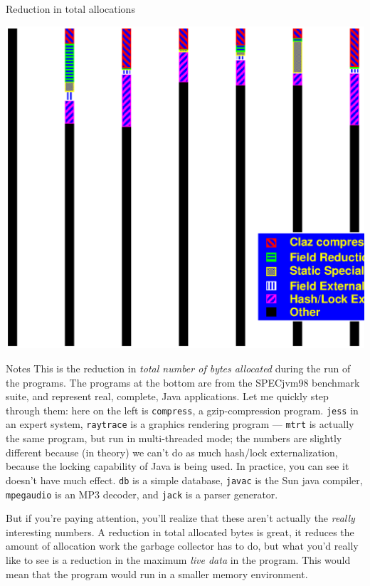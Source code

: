 \documentclass[%
pdf,
colorBG,
slideColor,
nototal,
oqe
]{prosper}
\newenvironment{talknotes}{\begin{slide}{Notes}\tiny}{\end{slide}}
\begin{document}
\begin{slide}{Reduction in total allocations}
\begin{center}
\includegraphics[scale=0.45]{Figures/oopsla-ttlalloc-color.eps}
\end{center}
\end{slide}

\begin{talknotes}
This is the reduction in \emph{total number of bytes allocated} during
the run of the programs.  The programs at the bottom are from the
SPECjvm98 benchmark suite, and represent real, complete, Java
applications.  Let me quickly step through them: here on the left is
{\tt compress}, a gzip-compression program.  {\tt jess} in an expert
system, {\tt raytrace} is a graphics rendering program --- {\tt mtrt}
is actually the same program, but run in multi-threaded mode; the
numbers are slightly different because (in theory) we can't do as much
hash/lock externalization, because the locking capability of Java is
being used.  In practice, you can see it doesn't have much effect.
{\tt db} is a simple database, {\tt javac} is the Sun java compiler,
{\tt mpegaudio} is an MP3 decoder, and {\tt jack} is a parser
generator.

But if you're paying attention, you'll realize that these aren't
actually the \emph{really} interesting numbers.  A reduction in total
allocated bytes is great, it reduces the amount of allocation work the
garbage collector has to do, but what you'd really like to see is a
reduction in the maximum \emph{live data} in the program.  This would
mean that the program would run in a smaller memory environment.

~%
\end{talknotes}
\end{document}
